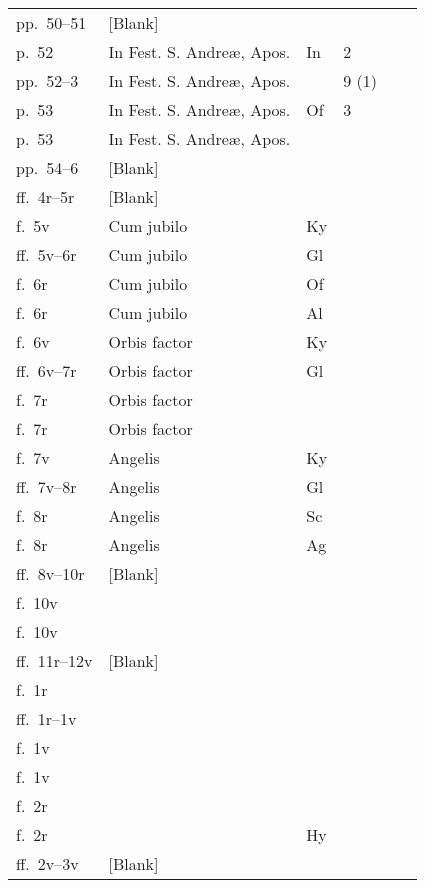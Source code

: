 \begin{longtable}[c]{@{}llllll@{}}
  pp.\ 50--51 & \multicolumn{5}{l}{[Blank]} \\
  p.\ 52 & In Fest. S. Andreæ, Apos. & In & 2 & \sharp{}\sharp{} & \bullet{} \\
  pp.\ 52--3 & In Fest. S. Andreæ, Apos. &  & 9 (1) & \flat{}\flat{}\flat{} & \bullet{} \\
  p.\ 53 & In Fest. S. Andreæ, Apos. & Of & 3 & \sharp{} & \bullet{} \\
  p.\ 53 & In Fest. S. Andreæ, Apos. &  &  & \sharp{} & \bullet{} \\
  pp.\ 54--6 & \multicolumn{5}{l}{[Blank]} \\
  ff.\ 4r--5r & \multicolumn{5}{l}{[Blank]} \\
  f.\ 5v & Cum jubilo & Ky &  & \flat{}\flat{} & \bullet{} \\
  ff.\ 5v--6r & Cum jubilo & Gl &  & \flat{}\flat{}\flat{} & \bullet{} \\
  f.\ 6r & Cum jubilo & Of &  & \flat{} & \bullet{} \\
  f.\ 6r & Cum jubilo & Al &  & \flat{} & \bullet{} \\
  f.\ 6v & Orbis factor & Ky &  & \sharp{}\sharp{} & \bullet{} \\
  ff.\ 6v--7r & Orbis factor & Gl &  & \natural{} & \bullet{} \\
  f.\ 7r & Orbis factor &  &  & \natural{} & \bullet{} \\
  f.\ 7r & Orbis factor &  &  & \natural{} & \bullet{} \\
  f.\ 7v & Angelis & Ky &  & \flat{} & \bullet{} \\
  ff.\ 7v--8r & Angelis & Gl &  & \flat{} & \bullet{} \\
  f.\ 8r & Angelis & Sc &  & \sharp{}\sharp{} & \bullet{} \\
  f.\ 8r & Angelis & Ag &  & \sharp{}\sharp{}\sharp{} & \bullet{} \\
  ff.\ 8v--10r & \multicolumn{5}{l}{[Blank]} \\
  f.\ 10v &  &  &  & \flat{}\flat{} & \bullet{} \\
  f.\ 10v &  &  &  & \sharp{}\sharp{} & \bullet{} \\
  ff.\ 11r--12v & \multicolumn{5}{l}{[Blank]} \\
  f.\ 1r &  &  &  & \sharp{}\sharp{} & \bullet{} \\
  ff.\ 1r--1v &  &  &  & \sharp{}\sharp{}\sharp{} & \bullet{} \\
  f.\ 1v &  &  &  & \flat{} & \bullet{} \\
  f.\ 1v &  &  &  & \sharp{}\sharp{} & \bullet{} \\
  f.\ 2r &  &  &  & \sharp{}\sharp{} & \bullet{} \\
  f.\ 2r &  & Hy &  & \sharp{} & \bullet{} \\
  ff.\ 2v--3v & \multicolumn{5}{l}{[Blank]} \\* \bottomrule
  \end{longtable}


